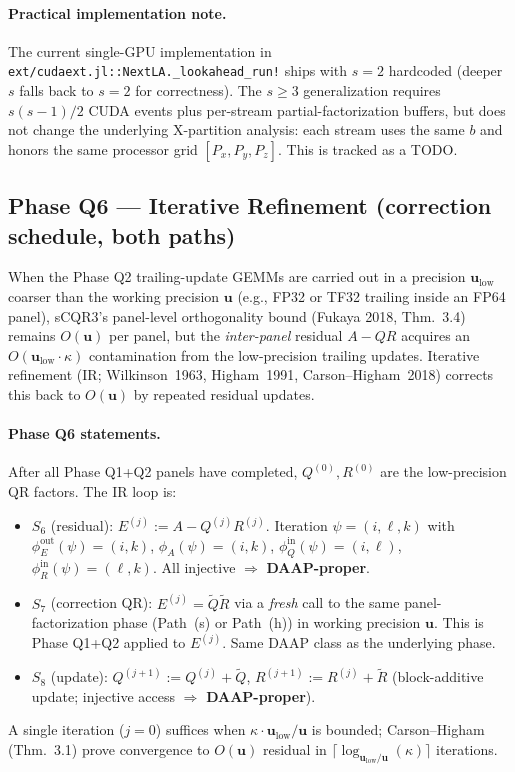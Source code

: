 \documentclass[11pt]{article}
\begin{document}
\paragraph{Practical implementation note.}
The current single-GPU implementation in
\texttt{ext/cudaext.jl::NextLA.\_lookahead\_run!} ships with $s = 2$
hardcoded (deeper $s$ falls back to $s = 2$ for correctness). The
$s \ge 3$ generalization requires $s(s{-}1)/2$ CUDA events plus
per-stream partial-factorization buffers, but does not change the
underlying X-partition analysis: each stream uses the same $b$ and
honors the same processor grid $[P_x, P_y, P_z]$. This is tracked as
a TODO.

\subsection*{Phase Q6 --- Iterative Refinement (correction schedule, both paths)}
\label{sec:A1-IR}

When the Phase Q2 trailing-update GEMMs are carried out in a precision
$\mathbf{u}_{\text{low}}$ coarser than the working precision
$\mathbf{u}$ (e.g., FP32 or TF32 trailing inside an FP64 panel),
sCQR3's panel-level orthogonality bound (Fukaya 2018, Thm.~3.4)
remains $O(\mathbf{u})$ per panel, but the \emph{inter-panel} residual
$A - QR$ acquires an $O(\mathbf{u}_{\text{low}} \cdot \kappa)$
contamination from the low-precision trailing updates. Iterative
refinement (IR; Wilkinson~1963, Higham~1991, Carson--Higham~2018)
corrects this back to $O(\mathbf{u})$ by repeated residual updates.

\paragraph{Phase Q6 statements.}
After all Phase Q1+Q2 panels have completed, $Q^{(0)}, R^{(0)}$ are
the low-precision QR factors. The IR loop is:
\begin{itemize}[leftmargin=2em]
  \item $S_6$ (residual): $E^{(j)} := A - Q^{(j)} R^{(j)}$.
        Iteration $\psi = (i,\ell,k)$ with $\phi_E^{\text{out}}(\psi) = (i,k)$,
        $\phi_A(\psi) = (i,k)$, $\phi_Q^{\text{in}}(\psi) = (i,\ell)$,
        $\phi_R^{\text{in}}(\psi) = (\ell,k)$. All injective $\Rightarrow$
        \textbf{DAAP-proper}.
  \item $S_7$ (correction QR): $E^{(j)} = \tilde Q \tilde R$ via a
        \emph{fresh} call to the same panel-factorization phase
        (Path~(s) or Path~(h)) in working precision $\mathbf{u}$. This
        is Phase Q1+Q2 applied to $E^{(j)}$. Same DAAP class as the
        underlying phase.
  \item $S_8$ (update):
        $Q^{(j+1)} := Q^{(j)} + \tilde Q$,
        $R^{(j+1)} := R^{(j)} + \tilde R$ (block-additive update;
        injective access $\Rightarrow$ \textbf{DAAP-proper}).
\end{itemize}
A single iteration ($j = 0$) suffices when $\kappa \cdot
\mathbf{u}_{\text{low}}/\mathbf{u}$ is bounded; Carson--Higham
(Thm.~3.1) prove convergence to $O(\mathbf{u})$ residual in
$\lceil \log_{\mathbf{u}_{\text{low}}/\mathbf{u}}(\kappa) \rceil$
iterations.
\end{document}
